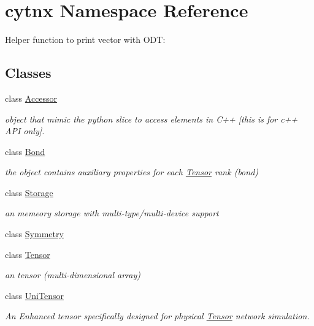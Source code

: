\hypertarget{namespacecytnx}{}\section{cytnx Namespace Reference}
\label{namespacecytnx}


Helper function to print vector with O\+DT\+:  


\subsection*{Classes}
\begin{DoxyCompactItemize}
\item 
class \hyperlink{classcytnx_1_1Accessor}{Accessor}
\begin{DoxyCompactList}\small\item\em object that mimic the python slice to access elements in C++ \mbox{[}this is for c++ A\+PI only\mbox{]}. \end{DoxyCompactList}\item 
class \hyperlink{classcytnx_1_1Bond}{Bond}
\begin{DoxyCompactList}\small\item\em the object contains auxiliary properties for each \hyperlink{classcytnx_1_1Tensor}{Tensor} rank (bond) \end{DoxyCompactList}\item 
class \hyperlink{classcytnx_1_1Storage}{Storage}
\begin{DoxyCompactList}\small\item\em an memeory storage with multi-\/type/multi-\/device support \end{DoxyCompactList}\item 
class \hyperlink{classcytnx_1_1Symmetry}{Symmetry}
\item 
class \hyperlink{classcytnx_1_1Tensor}{Tensor}
\begin{DoxyCompactList}\small\item\em an tensor (multi-\/dimensional array) \end{DoxyCompactList}\item 
class \hyperlink{classcytnx_1_1UniTensor}{Uni\+Tensor}
\begin{DoxyCompactList}\small\item\em An Enhanced tensor specifically designed for physical \hyperlink{classcytnx_1_1Tensor}{Tensor} network simulation. \end{DoxyCompactList}\end{DoxyCompactItemize}
